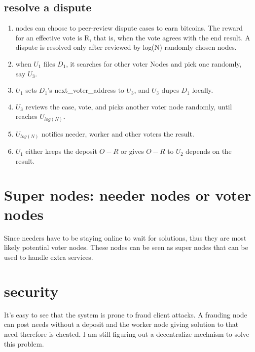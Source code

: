 \documentclass[12pt]{article}
\begin{document}
\subsection{resolve a dispute}
\begin{enumerate}
	\item nodes can choose to peer-review dispute cases to earn bitcoins. The reward for an effective vote is R, that is, when the vote agrees with the end result. A dispute is resolved only after reviewed by log(N) randomly chosen nodes.
	\item when $U_1$ files $D_1$, it searches for other voter Nodes and pick one randomly, say $U_3$. 
	\item $U_1$ sets $D_1$'s next\_voter\_address to $U_3$, and $U_3$ dupes $D_1$ locally. 
	\item $U_3$ reviews the case, vote, and picks another voter node randomly, until reaches $U_{log(N)}$.
	\item $U_{log(N)}$ notifies needer, worker and other voters the result.
	\item $U_1$ either keeps the deposit $O-R$ or gives $O-R$ to $U_2$ depends on the result.
\end{enumerate}

\section{Super nodes: needer nodes or voter nodes}
Since needers have to be staying online to wait for solutions, thus they are most likely potential voter nodes. These nodes can be seen as super nodes that can be used to handle extra services.

\section{security}
It's easy to see that the system is prone to fraud client attacks. A frauding node can post needs without a deposit and the worker node giving solution to that need therefore is cheated. I am still figuring out a decentralize mechnism to solve this problem.

\begin{thebibliography}{9}
\end{thebibliography}

	
\end{document}
